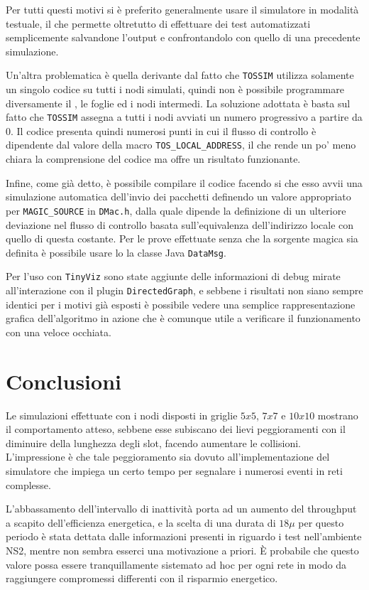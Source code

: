 \documentclass[twoside,11pt,a4paper,italian,openany]{book}
\newcommand{\tv}{\texttt{TinyViz} }
\newcommand{\tos}{\texttt{TOSSIM} }
\begin{document}
Per tutti questi motivi si è preferito generalmente usare il simulatore in modalità testuale, 
il che permette oltretutto di effettuare dei test automatizzati semplicemente salvandone
 l'output e confrontandolo con quello di una precedente simulazione. 

Un'altra problematica è quella derivante dal fatto che \tos utilizza solamente un singolo 
codice su tutti i nodi simulati, quindi non è possibile programmare diversamente il \sink, 
le foglie ed i nodi intermedi. 
La soluzione adottata è basta sul fatto che \tos assegna a tutti i nodi avviati un numero 
progressivo a partire da $0$. 
Il codice presenta quindi numerosi punti in cui il flusso di controllo 
è dipendente dal valore della macro \texttt{TOS\_LOCAL\_ADDRESS}, il che rende un po' meno 
chiara la comprensione del codice ma offre un risultato funzionante. 

Infine, come già detto, è possibile compilare il codice facendo si che esso avvii una 
simulazione automatica dell'invio dei pacchetti definendo un valore appropriato per 
\texttt{MAGIC\_SOURCE} in \texttt{DMac.h}, dalla quale dipende la definizione di un ulteriore 
deviazione nel flusso di controllo basata sull'equivalenza dell'indirizzo locale con quello di 
questa costante. 
Per le prove effettuate senza che la sorgente magica sia definita è possibile usare lo 
la classe Java \texttt{DataMsg}.

Per l'uso con \tv sono state aggiunte delle informazioni di debug mirate all'interazione con 
il plugin  \texttt{DirectedGraph}, e sebbene i risultati non siano sempre identici per i 
motivi già esposti è possibile vedere una semplice rappresentazione grafica dell'algoritmo 
in azione che è comunque utile a verificare il funzionamento con una veloce occhiata. 

\chapter{Conclusioni}
Le simulazioni effettuate con i nodi disposti in griglie $5x5$, $7x7$ e $10x10$ mostrano il
comportamento atteso, sebbene esse subiscano dei lievi peggioramenti con il diminuire della 
lunghezza degli slot, facendo aumentare le collisioni.
L'impressione è che tale peggioramento sia dovuto all'implementazione del simulatore 
che impiega un certo tempo per segnalare i numerosi eventi in reti complesse.

L'abbassamento dell'intervallo di inattività porta ad un aumento del throughput 
a scapito dell'efficienza energetica, e la scelta di una durata di $18\mu$ per questo periodo 
è stata dettata dalle informazioni presenti in \cite{DMAC} riguardo i test nell'ambiente 
NS2, mentre non sembra esserci una motivazione a priori. \`E probabile che questo valore 
possa essere tranquillamente sistemato ad hoc per ogni rete in modo da raggiungere compromessi 
differenti con il risparmio energetico. 
\end{document}

